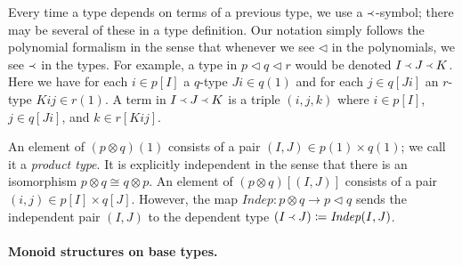 \documentclass[11pt, one side, article]{memoir}
\theoremstyle{definition}
\theoremstyle{plain}
\newcommand{\Fun}[1]{\mathit{#1}}%
\newcommand{\0}{\textsf{0}}
\newcommand{\1}{\tn{\textsf{1}}}
\newcommand{\tri}{\mathbin{\triangleleft}}
\newcommand{\indep}{\Fun{Indep}}
\newcommand{\founds}{\Yleft}
\begin{document}
Every time a type depends on terms of a previous type, we use a $\founds$-symbol; there may be several of these in a type definition. Our notation simply follows the polynomial formalism in the sense that whenever we see $\tri$ in the polynomials, we see $\founds$ in the types. For example, a type in $p\tri q\tri r$ would be denoted $I\founds J\founds K$. Here we have for each $i\in p[I]$ a $q$-type $Ji\in q(1)$ and for each $j\in q[J i]$ an $r$-type $Kij\in r(1)$. A term in $I\founds J\founds K$ is a triple $(i,j,k)$ where $i\in p[I]$, $j\in q[Ji]$, and $k\in r[Kij]$.

An element of $(p\otimes q)(1)$ consists of a pair $(I,J)\in p(1)\times q(1)$; we call it a \emph{product type}. It is explicitly independent in the sense that there is an isomorphism $p\otimes q\cong q\otimes p$. An element of $(p\otimes q)[(I,J)]$ consists of a pair $(i,j)\in p[I]\times q[J]$. However, the map $\indep\colon p\otimes q\to p\tri q$ sends the independent pair $(I,J)$ to the dependent type $(I\founds J)\coloneqq\indep(I,J)$.

\paragraph{Monoid structures on base types.}
\end{document}
